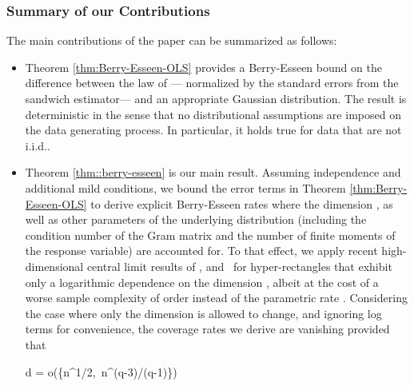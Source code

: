 \documentclass{article}
\begin{document}
\subsubsection*{Summary of our Contributions}
The main
contributions of the paper can be summarized as follows:
\begin{itemize}
\item Theorem \ref{thm:Berry-Esseen-OLS}
provides a Berry-Esseen bound
on the difference between
the law of   ---
normalized by the standard errors from the sandwich estimator---
and an appropriate Gaussian distribution.
The result is deterministic in the sense that
no distributional assumptions are imposed
on the data generating process. In particular, it holds true for data that are not i.i.d..
\item
Theorem \ref{thm::berry-esseen}
is our main result.
Assuming independence and additional mild conditions,
we bound the error terms in
Theorem \ref{thm:Berry-Esseen-OLS}
to derive explicit Berry-Esseen rates where the dimension  , as well as other parameters of the underlying distribution (including the condition number of the Gram matrix and the number of finite moments of the response variable) are accounted for.
To that effect, we apply recent high-dimensional central limit results of \cite{koike2019high}, and~\cite{Chern17} for hyper-rectangles that exhibit only a logarithmic dependence on the dimension  , albeit at the cost of a worse sample complexity of order
  instead of the parametric rate  .
Considering
the case where only the dimension   is allowed to change, and ignoring log terms for convenience, the coverage rates we derive are vanishing provided that
 
d = o\left(\min\left\{n^{1/2},\, n^{(q-3)/(q-1)}\right\}\right)
 

\end{itemize}
\end{document}
